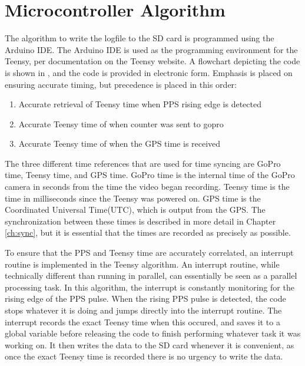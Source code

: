 \section{Microcontroller Algorithm}\label{sec:algoLog}
The algorithm to write the logfile to the SD card is programmed using the Arduino IDE.  The Arduino IDE is used as the programming environment for the Teensy, per documentation on the Teensy website.  A flowchart depicting the code is shown in , and the code is provided in electronic form.  Emphasis is placed on ensuring accurate timing, but precedence is placed in this order:
\begin{enumerate}
	\item Accurate retrieval of Teensy time when PPS rising edge is detected
	\item Accurate Teensy time of when counter was sent to gopro
	\item Accurate Teensy time of when the GPS time is received
\end{enumerate}
The three different time references that are used for time syncing are GoPro time, Teensy time, and GPS time.  GoPro time is the internal time of the GoPro camera in seconds from the time the video began recording.  Teensy time is the time in milliseconds since the Teensy was powered on.  GPS time is the Coordinated Universal Time(UTC), which is output from the GPS.  The synchronization between these times is described in more detail in Chapter \ref{ch:sync}, but it is essential that the times are recorded as precisely as possible.  

To ensure that the PPS and Teensy time are accurately correlated, an interrupt routine is implemented in the Teensy algorithm.  An interrupt routine, while technically different than running in parallel, can essentially be seen as a parallel processing task.  In this algorithm, the interrupt is constantly monitoring for the rising edge of the PPS pulse.  When the rising PPS pulse is detected, the code stops whatever it is doing and jumps directly into the interrupt routine.  The interrupt records the exact Teensy time when this occured, and saves it to a global variable before releasing the code to finish performing whatever task it was working on.  It then writes the data to the SD card whenever it is convenient, as once the exact Teensy time is recorded there is no urgency to write the data.  

